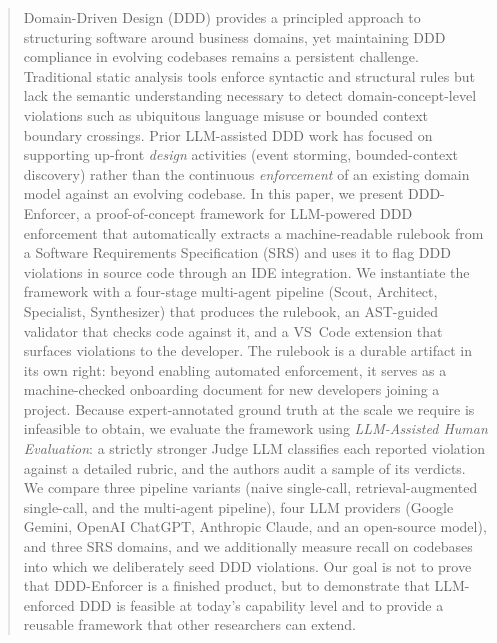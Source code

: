 \documentclass[smallextended]{svjour3}
\begin{document}
\begin{abstract}
Domain-Driven Design (DDD) provides a principled approach to structuring software around business domains, yet maintaining DDD compliance in evolving codebases remains a persistent challenge.
Traditional static analysis tools enforce syntactic and structural rules but lack the semantic understanding necessary to detect domain-concept-level violations such as ubiquitous language misuse or bounded context boundary crossings.
Prior LLM-assisted DDD work has focused on supporting up-front \emph{design} activities (event storming, bounded-context discovery) rather than the continuous \emph{enforcement} of an existing domain model against an evolving codebase.
In this paper, we present DDD-Enforcer, a proof-of-concept framework for LLM-powered DDD enforcement that automatically extracts a machine-readable rulebook from a Software Requirements Specification (SRS) and uses it to flag DDD violations in source code through an IDE integration.
We instantiate the framework with a four-stage multi-agent pipeline (Scout, Architect, Specialist, Synthesizer) that produces the rulebook, an AST-guided validator that checks code against it, and a VS~Code extension that surfaces violations to the developer.
The rulebook is a durable artifact in its own right: beyond enabling automated enforcement, it serves as a machine-checked onboarding document for new developers joining a project.
Because expert-annotated ground truth at the scale we require is infeasible to obtain, we evaluate the framework using \emph{LLM-Assisted Human Evaluation}: a strictly stronger Judge LLM classifies each reported violation against a detailed rubric, and the authors audit a sample of its verdicts.
We compare three pipeline variants (naive single-call, retrieval-augmented single-call, and the multi-agent pipeline), four LLM providers (Google Gemini, OpenAI ChatGPT, Anthropic Claude, and an open-source model), and three SRS domains, and we additionally measure recall on codebases into which we deliberately seed DDD violations.
Our goal is not to prove that DDD-Enforcer is a finished product, but to demonstrate that LLM-enforced DDD is feasible at today's capability level and to provide a reusable framework that other researchers can extend.

\end{abstract}
\end{document}
